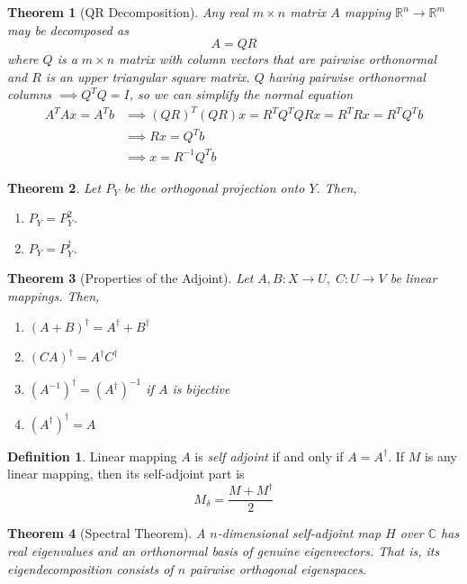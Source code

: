 \documentclass{article}
\newtheorem{theorem}{Theorem}[section]
\theoremstyle{remark}
\theoremstyle{definition}
\newtheorem{definition}{Definition}[section]
\begin{document}
\begin{theorem}[QR Decomposition]
Any real $m \times n$ matrix $A$ mapping $\mathbb{R}^n \longrightarrow \mathbb{R}^m$ may be decomposed as
\[A = Q R\] 
where $Q$ is a $m \times n$ matrix with column vectors that are pairwise orthonormal and $R$ is an upper triangular square matrix. $Q$ having pairwise orthonormal columns $\implies Q^T Q = I$, so we can simplify the normal equation
\begin{align*}
    A^T A x = A^T b & \implies (Q R)^T (Q R) x = R^T Q^T Q R x = R^T R x = R^T Q^T b \\
    & \implies R x = Q^T b \\
    & \implies x = R^{-1} Q^T b
\end{align*}
\end{theorem}

\begin{theorem}
Let $P_Y$ be the orthogonal projection onto $Y$. Then, 
\begin{enumerate}
    \item $P_Y = P_Y^2$. 
    \item $P_Y = P_Y^\dagger$. 
\end{enumerate}
\end{theorem}

\begin{theorem}[Properties of the Adjoint] Let $A, B: X \longrightarrow U, \; C: U \longrightarrow V$ be linear mappings. Then, 
\begin{enumerate}
    \item $(A + B)^\dagger = A^\dagger + B^\dagger$
    \item $(C A)^\dagger = A^\dagger C^\dagger$
    \item $(A^{-1})^\dagger = (A^\dagger)^{-1}$ if $A$ is bijective
    \item $(A^\dagger)^\dagger = A$
\end{enumerate}
\end{theorem}

\begin{definition}
Linear mapping $A$ is \textit{self adjoint} if and only if $A = A^\dagger$. If $M$ is any linear mapping, then its self-adjoint part is 
\[M_\delta = \frac{M + M^\dagger}{2}\]
\end{definition}

\begin{theorem}[Spectral Theorem]
A $n$-dimensional self-adjoint map $H$ over $\mathbb{C}$ has real eigenvalues and an orthonormal basis of genuine eigenvectors. That is, its eigendecomposition consists of $n$ pairwise orthogonal eigenspaces. 
\end{theorem}
\end{document}
